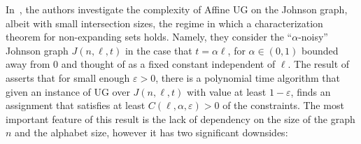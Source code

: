 \documentclass[11pt]{article}
\def \eps {{\varepsilon}}
\theoremstyle{definition}
\begin{document}
In~\cite{BBKSS}, the authors investigate the complexity of Affine UG 
on the Johnson graph, albeit with small intersection sizes, the regime in which a characterization theorem for non-expanding sets holds. 
Namely, they consider
the ``$\alpha$-noisy'' Johnson graph $J(n,\ell,t)$ in the case that $t = \alpha \ell$, for $\alpha\in (0,1)$ bounded away from $0$ and thought of as a fixed constant independent of $\ell$.
The result of~\cite{BBKSS} 
asserts that for small enough $\eps>0$, there is a polynomial time algorithm
that given an instance of UG over $J(n,\ell,t)$ with value at least 
$1-\eps$, finds an assignment that satisfies at least $C(\ell,\alpha,\eps)>0$
of the constraints. The most important feature of this result is the lack
of dependency on the size of the graph $n$ and the alphabet size, however 
it has two significant downsides:
\end{document}
